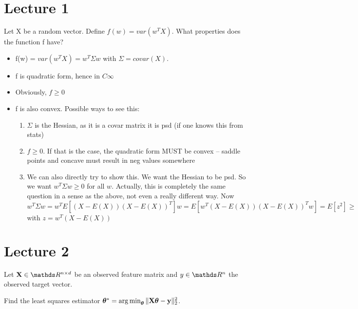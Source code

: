\documentclass[a4paper]{article}
\begin{document}






\section{Lecture 1}
Let X be a random vector. Define $f(w) = var(w^T X)$. What properties does the function f have?
\begin{itemize}
    \item f(w) = $var(w^T X) = w^T \Sigma w$ with $\Sigma = covar(X)$. 
    \item f is quadratic form, hence in $C\infty$
    \item Obviously, $f \geq 0$
    \item f is also convex. Possible ways to see this:
\begin{enumerate}
    \item $\Sigma$ is the Hessian, as it is a covar matrix it is psd (if one knows this from stats)
    \item $f \geq 0$. If that is the case, the quadratic form MUST be convex -- saddle points and concave must result in neg values somewhere
    \item We can also directly try to show this. We want the Hessian to be psd. So we want $w^T \Sigma w \geq 0$ for all $w$. Actually, this is completely the same question in a sense as the above, not even a really different way. Now
    $$w^T \Sigma w = w^T E[ (X - E(X)) (X - E(X))^T] w = 
    E[ w^T (X - E(X)) (X - E(X))^T w] = E[z^2] \geq 
    $$
    with $z =  w^T (X - E(X))$
\end{enumerate}
    
\end{itemize}
\section{Lecture 2}

Let $\mathbf{X} \in \R^{n \times d}$ be an observed feature matrix and $y \in \R^n$ the observed target vector.

Find the least squares estimator $\bm{\theta}^* =  \operatorname{arg\,min}_{\bm{\theta}} \Vert \mathbf{X} \bm{\theta} - \mathbf{y}\Vert^2_2$.
\end{document}

